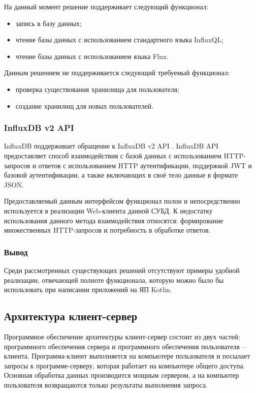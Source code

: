 На данный момент решение поддерживает следующий функционал:
\begin{itemize}[leftmargin=1.6\parindent]
\item запись в базу данных;
\item чтение базы данных с использованием стандартного языка InfluxQL;
\item чтение базы данных с использованием языка Flux.
\end{itemize}

Данным решением не поддерживается следующий требуемый функционал:
\begin{itemize}[leftmargin=1.6\parindent]
\item проверка существования хранилища для пользователя;
\item создание хранилищ для новых пользователей.
\end{itemize}

\subsubsection{InfluxDB v2 API}
InfluxDB поддерживает обращение к InfluxDB v2 API \cite{influxApi}. InfluxDB API предоставляет способ взаимодействия с базой данных с использованием HTTP-запросов и ответов с использованием HTTP аутентификации, поддержкой JWT и базовой аутентификации, а также включающих в своё тело данные в формате JSON.

Предоставляемый данным интерфейсом функционал полон и непосредственно используется в реализации Web-клиента данной СУБД. К недостатку использования данного метода взаимодействия относятся: формирование множественных HTTP-запросов и потребность в обработке ответов.

\subsubsection*{Вывод}
Среди рассмотренных существующих решений отсутствуют примеры удобной реализации, отвечающей полноте функционала, которую можно было бы использовать при написании приложений на ЯП Kotlin.

\subsection{Архитектура клиент-сервер}
Программное обеспечение архитектуры клиент-сервер состоит из двух частей: программного обеспечения сервера и программного обеспечения пользователя -- клиента. Программа-клиент выполняется на компьютере пользователя и посылает запросы к программе-серверу, которая работает на компьютере общего доступа. Основная обработка данных производится мощным сервером, а на компьютер пользователя возвращаются только результаты выполнения запроса. \cite{clientServer}

